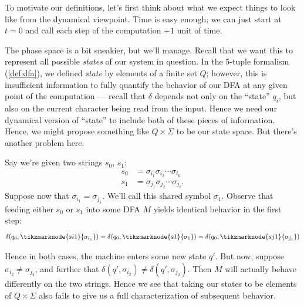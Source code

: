 \documentclass{fkpaper}
\begin{document}
\begin{multicols}{2}
To motivate our definitions, let's first think about what we expect
things to look like from the dynamical viewpoint. Time is easy enough;
we can just start at $t=0$ and call each step of the computation $+1$
unit of time.

The phase space is a bit sneakier, but we'll manage. Recall that we
want this to represent all possible \emph{states} of our system in
question. In the 5-tuple formalism (\cref{def:dfa}), we defined
\emph{state} by elements of a finite set $Q$; however, this is
insufficient information to fully quantify the behavior of our DFA at
any given point of the computation --- recall that $\delta$ depends
not only on the ``state'' $q_i$, but also on the current character
being read from the input. Hence we need our dynamical version of
``state'' to include both of these pieces of information. Hence, we
might propose something like $Q \times \Sigma$ to be our state space.
But there's another problem here.

Say we're given two strings $s_0$, $s_1$:
\begin{align*}
  s_0
  &= \sigma_{i_1} \sigma_{i_2} \cdots \sigma_{i_k} \\
  s_1
  &= \sigma_{j_1} \sigma_{j_2} \cdots \sigma_{j_\ell}.
\end{align*}
Suppose now that $\sigma_{i_1} = \sigma_{j_1}$. We'll call this shared
symbol $\sigma_1$. Observe that feeding either $s_0$ or $s_1$ into
some DFA $M$ yields identical behavior in the first step:
\[
  \delta(q_0, \tikzmarknode{si1}{\sigma_{i_1}})
  = \delta(q_0, \tikzmarknode{s1}{\sigma_1})
  = \delta(q_0, \tikzmarknode{sj1}{\sigma_{j_1}})
\]

Hence in both cases, the machine enters some new state $q'$. But now,
suppose $\sigma_{i_2} \neq \sigma_{j_2}$, and further that $\delta(q',
\sigma_{i_2}) \neq \delta(q', \sigma_{j_2})$. Then $M$ will actually
behave differently on the two strings. Hence we see that taking our
states to be elements of $Q \times \Sigma$ also fails to give us a
full characterization of subsequent behavior.


\end{multicols}
\end{document}
